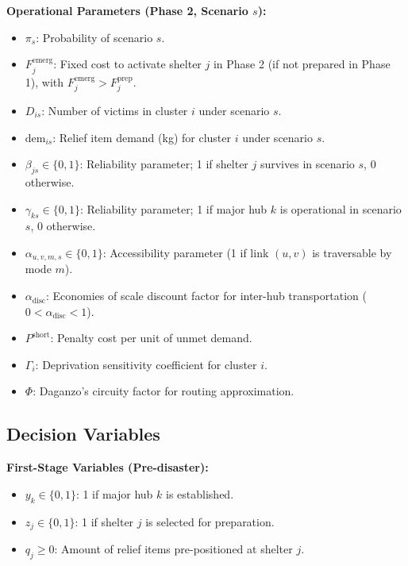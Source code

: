 \textbf{Operational Parameters (Phase 2, Scenario $s$):}
\begin{itemize}
    \item $\pi_s$: Probability of scenario $s$.
    \item $F_j^{\text{emerg}}$: Fixed cost to activate shelter $j$ in Phase 2 (if not prepared in Phase 1), with $F_j^{\text{emerg}} > F_j^{\text{prep}}$.
    \item $D_{is}$: Number of victims in cluster $i$ under scenario $s$.
    \item $\text{dem}_{is}$: Relief item demand (kg) for cluster $i$ under scenario $s$.
    \item $\beta_{js} \in \{0,1\}$: Reliability parameter; 1 if shelter $j$ survives in scenario $s$, 0 otherwise.
    \item $\gamma_{ks} \in \{0,1\}$: Reliability parameter; 1 if major hub $k$ is operational in scenario $s$, 0 otherwise.
    \item $\alpha_{u,v,m,s} \in \{0,1\}$: Accessibility parameter (1 if link $(u,v)$ is traversable by mode $m$).
    \item $\alpha_{\text{disc}}$: Economies of scale discount factor for inter-hub transportation ($0 < \alpha_{\text{disc}} < 1$).
    \item $P^{\text{short}}$: Penalty cost per unit of unmet demand.
    \item $\Gamma_i$: Deprivation sensitivity coefficient for cluster $i$.
    \item $\Phi$: Daganzo's circuity factor for routing approximation.
\end{itemize}

\subsection{Decision Variables}
\textbf{First-Stage Variables (Pre-disaster):}
\begin{itemize}
    \item $y_k \in \{0,1\}$: 1 if major hub $k$ is established.
    \item $z_j \in \{0,1\}$: 1 if shelter $j$ is selected for preparation.
    \item $q_j \ge 0$: Amount of relief items pre-positioned at shelter $j$.
\end{itemize}

